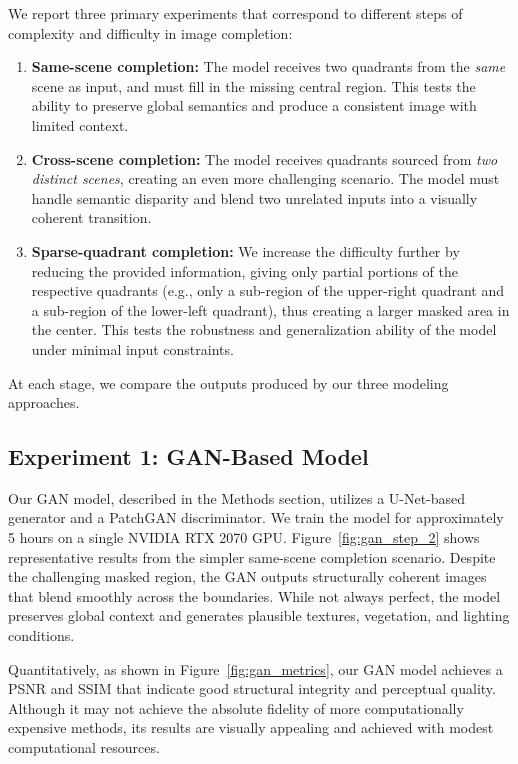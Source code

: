 \documentclass[sigconf]{acmart}
\begin{document}
We report three primary experiments that correspond to different steps of complexity and difficulty in image completion:

\begin{enumerate}
    \item \textbf{Same-scene completion:} The model receives two quadrants from the \emph{same} scene as input, and must fill in the missing central region. This tests the ability to preserve global semantics and produce a consistent image with limited context.
    
    \item \textbf{Cross-scene completion:} The model receives quadrants sourced from \emph{two distinct scenes}, creating an even more challenging scenario. The model must handle semantic disparity and blend two unrelated inputs into a visually coherent transition.
    
    \item \textbf{Sparse-quadrant completion:} We increase the difficulty further by reducing the provided information, giving only partial portions of the respective quadrants (e.g., only a sub-region of the upper-right quadrant and a sub-region of the lower-left quadrant), thus creating a larger masked area in the center. This tests the robustness and generalization ability of the model under minimal input constraints.
\end{enumerate}

At each stage, we compare the outputs produced by our three modeling approaches.

\subsection*{Experiment 1: GAN-Based Model}
\label{sec:gan_exp}

Our GAN model, described in the Methods section, utilizes a U-Net-based generator and a PatchGAN discriminator. We train the model for approximately 5 hours on a single NVIDIA RTX 2070 GPU. Figure~\ref{fig:gan_step_2} shows representative results from the simpler same-scene completion scenario. Despite the challenging masked region, the GAN outputs structurally coherent images that blend smoothly across the boundaries. While not always perfect, the model preserves global context and generates plausible textures, vegetation, and lighting conditions. 

Quantitatively, as shown in Figure~\ref{fig:gan_metrics}, our GAN model achieves a PSNR and SSIM that indicate good structural integrity and perceptual quality. Although it may not achieve the absolute fidelity of more computationally expensive methods, its results are visually appealing and achieved with modest computational resources.
\end{document}
